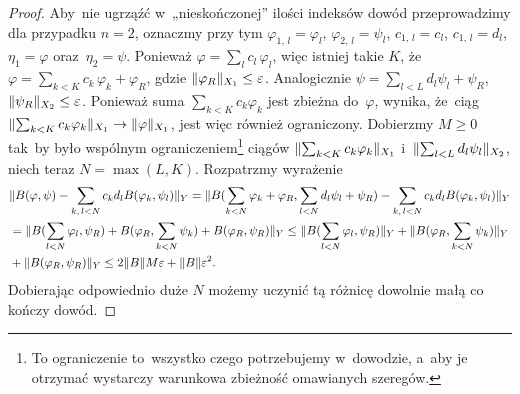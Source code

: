 \documentclass[a4paper,11pt]{article}
\begin{document}
\begin{proof}

  Aby~nie ugrząźć w~„nieskończonej” ilości indeksów dowód
  przeprowadzimy dla przypadku $n = 2$, oznaczmy przy tym
  $\varphi_{ 1,\, l } = \varphi_{ l }$, $\varphi_{ 2, \, l } = \psi_{ l }$,
  $c_{ 1, \, l } = c_{ l }$, $c_{ 1, \, l } = d_{ l }$,
  $\eta_{ 1 } = \varphi$ oraz~$\eta_{ 2 } = \psi$. Ponieważ
  $\varphi = \sum_{ l } c_{ l } \, \varphi_{ l }$, więc istniej takie $K$,
  że~$\varphi = \sum_{ k < K } c_{ k } \, \varphi_{ k } + \varphi_{ R }$, gdzie
  $\lVert{  \varphi_{ R }  }\rVert_{ X_{ 1 } } \leq \varepsilon$. Analogicznie
  $\psi = \sum_{ l < L } d_{ l } \psi_{ l } + \psi_{ R }$,
  $\lVert{  \psi_{ R }  }\rVert_{ X_{ 2 } } \leq \varepsilon$. Ponieważ suma
  $\sum_{ k < K } c_{ k } \varphi_{ k }$ jest zbieżna do~$\varphi$, wynika,
  że~ciąg
  $\lVert{  \sum_{ k < K } c_{ k } \varphi_{ k }  }\rVert_{ X_{ 1 } } \to \lVert{ 
    \varphi  }\rVert_{ X_{ 1 } }$, jest więc również ograniczony. Dobierzmy
  $M \geq 0$ tak~by było wspólnym ograniczeniem\footnote{To
    ograniczenie to~wszystko czego potrzebujemy w~dowodzie, a~aby je
    otrzymać wystarczy warunkowa zbieżność omawianych szeregów.}
  ciągów $\lVert{  \sum_{ k < K } c_{ k } \varphi_{ k }  }\rVert_{ X_{ 1 } }$
  i~$\lVert{  \sum_{ l < L } d_{ l } \psi_{ l }  }\rVert_{ X_{ 2 } }$, niech
  teraz $N = \max( L, K )$. Rozpatrzmy wyrażenie
  \begin{equation}
    \begin{split}
      \label{RS-Vol-I-s02-05}
      &\Vert B( \varphi, \psi ) - \sum_{ k, \, l < N } c_{ k } d_{ l }
        B( \varphi_{ k }, \psi_{ l } ) \Vert_{ Y }
        =
        \Vert B( \sum_{ k < N } \varphi_{ k } + \varphi_{ R }, \sum_{ l < N } d_{ l } \psi_{ l }
        + \psi_{ R } ) - \sum_{ k,\, l < N } c_{ k } d_{ l }
        B( \varphi_{ k }, \psi_{ l } ) \Vert_{ Y } \\
      &=
        \Vert B( \sum_{ l < N } \varphi_{ l }, \psi_{ R } )
        + B( \varphi_{ R }, \sum_{ k < N } \psi_{ k } )
        + B( \varphi_{ R }, \psi_{ R } ) \Vert_{ Y }
        \leq
        \Vert B( \sum_{ l < N } \varphi_{ l }, \psi_{ R } ) \Vert_{ Y }
        + \Vert B( \varphi_{ R }, \sum_{ k < N } \psi_{ k } ) \Vert_{ Y } \\
      &+ \Vert B( \varphi_{ R }, \psi_{ R } ) \Vert_{ Y }
        \leq 2 \lVert{  B  }\rVert M \varepsilon + \lVert{  B  }\rVert \varepsilon^{ 2 }.
    \end{split}
  \end{equation}
  Dobierając odpowiednio duże $N$ możemy uczynić tą różnicę dowolnie
  małą co kończy dowód.

\end{proof}
\end{document}
